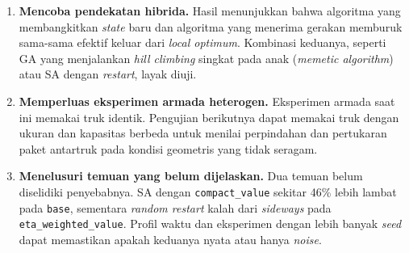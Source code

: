 \begin{enumerate}
    \item \textbf{Mencoba pendekatan hibrida.} Hasil menunjukkan bahwa algoritma yang membangkitkan \textit{state} baru dan algoritma yang menerima gerakan memburuk sama-sama efektif keluar dari \textit{local optimum}. Kombinasi keduanya, seperti GA yang menjalankan \textit{hill climbing} singkat pada anak (\textit{memetic algorithm}) atau SA dengan \textit{restart}, layak diuji.

    \item \textbf{Memperluas eksperimen armada heterogen.} Eksperimen armada saat ini memakai truk identik. Pengujian berikutnya dapat memakai truk dengan ukuran dan kapasitas berbeda untuk menilai perpindahan dan pertukaran paket antartruk pada kondisi geometris yang tidak seragam.

    \item \textbf{Menelusuri temuan yang belum dijelaskan.} Dua temuan belum diselidiki penyebabnya. SA dengan \texttt{compact\_value} sekitar 46\% lebih lambat pada \texttt{base}, sementara \textit{random restart} kalah dari \textit{sideways} pada \texttt{eta\_weighted\_value}. Profil waktu dan eksperimen dengan lebih banyak \textit{seed} dapat memastikan apakah keduanya nyata atau hanya \textit{noise}.
\end{enumerate}